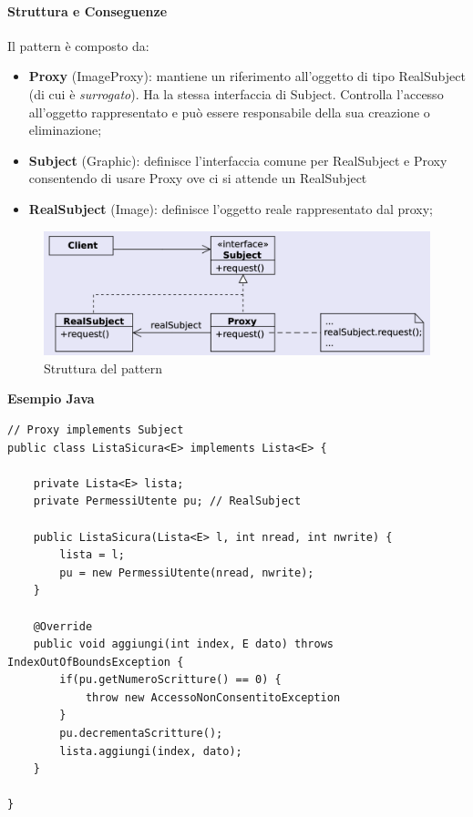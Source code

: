 \paragraph{Struttura e Conseguenze} Il pattern è composto da:
\begin{itemize}
    \item \textbf{Proxy} (ImageProxy): mantiene un riferimento all'oggetto di tipo RealSubject (di cui è \textit{surrogato}). Ha la stessa interfaccia di Subject. Controlla l'accesso all'oggetto rappresentato e può essere responsabile della sua creazione o eliminazione;
    \item \textbf{Subject} (Graphic): definisce l'interfaccia comune per RealSubject e Proxy consentendo di usare Proxy ove ci si attende un RealSubject
    \item \textbf{RealSubject} (Image): definisce l'oggetto reale rappresentato dal proxy;
\end{itemize}


\begin{figure}[H]
    \centering
    \includegraphics[width=1\linewidth]{assets/pattern/proxy/proxy-struttura.png}
    \caption{Struttura del pattern}
\end{figure}

\textbf{Esempio Java}
\begin{verbatim}
// Proxy implements Subject
public class ListaSicura<E> implements Lista<E> {

    private Lista<E> lista;
    private PermessiUtente pu; // RealSubject

    public ListaSicura(Lista<E> l, int nread, int nwrite) {
        lista = l;
        pu = new PermessiUtente(nread, nwrite);
    }

    @Override
    public void aggiungi(int index, E dato) throws IndexOutOfBoundsException {
        if(pu.getNumeroScritture() == 0) {
            throw new AccessoNonConsentitoException
        }
        pu.decrementaScritture();
        lista.aggiungi(index, dato);
    }

}
\end{verbatim}


\newpage